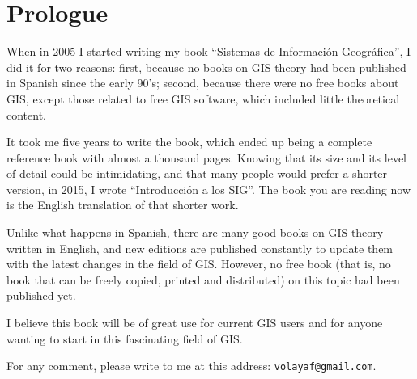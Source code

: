 \chapter*{Prologue}


When in 2005 I started writing my book ``Sistemas de Informaci\'{o}n Geogr\'{a}fica'', I did it for two reasons: first, because no books on GIS theory had been published in Spanish since the early 90's; second, because there were no free books about GIS, except those related to free GIS software, which included little theoretical content.

It took me five years to write the book, which ended up being a complete reference book with almost a thousand pages. Knowing that its size and its level of detail could be intimidating, and that many people would prefer a shorter version, in 2015, I wrote ``Introducci\'{o}n a los SIG''. The book you are reading now is the English translation of that shorter work.

Unlike what happens in Spanish, there are many good books on GIS theory written in English, and new editions are published constantly to update them with the latest changes in the field of GIS. However, no free book (that is, no book that can be freely copied, printed and distributed) on this topic had been published yet. 

I believe this book will be of great use for current GIS users and for anyone wanting to start in this fascinating field of GIS. 

For any comment, please write to me at this address: \texttt{volayaf@gmail.com}.